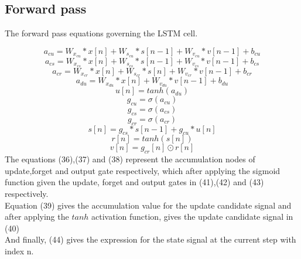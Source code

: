 \documentclass[12pt,a4paper]{article}
\begin{document}
{\subsection{Forward pass}
The forward pass equations governing the LSTM cell.

\[    
a_{cu} = W_{x_{cu}}*x[n] + W_{s_{cu}}*s[n-1] + W_{v_{cu}}*v[n-1] + b_{cu} \tag{36}
\]
\[
a_{cs} = W_{x_{cs}}*x[n] + W_{s_{cs}}*s[n-1] + W_{v_{cs}}*v[n-1] + b_{cs} \tag{37}
\]
\[
a_{cr} = W_{x_{cr}}*x[n] + W_{s_{cr}}*s[n] + W_{v_{cr}}*v[n-1] + b_{cr}   \tag{38}
\]
\[
a_{du} = W_{x_{du}}*x[n]  + W_{v_{du}}*v[n-1] + b_{du}\tag{39}
\]
\[
u[n] = tanh(a_{du}) \tag{40}
\]
\[
g_{cu} = \sigma(a_{cu})\tag{41}
\]
\[
g_{cs} = \sigma(a_{cs})\tag{42}
\]
\[
g_{cr} = \sigma(a_{cr})\tag{43}
\]
\[
s[n] = g_{cs}*s[n-1]+g_{cu}*u[n]\tag{44}
\]
\[
r[n] = tanh(s[n])\tag{45}
\]
\[
v[n] = g_{cr}[n]\odot r[n]\tag{46}
\]
The equations (36),(37) and (38) represent the accumulation nodes of update,forget and output gate respectively, which after applying the sigmoid function given the update, forget and output gates in (41),(42) and (43) respectively.
\\
Equation (39) gives the accumulation value for the update candidate signal and after applying the $tanh$ activation function, gives the update candidate signal in (40)\\
And finally, (44) gives the expression for the state signal at the current step with index n.
}
\end{document}
